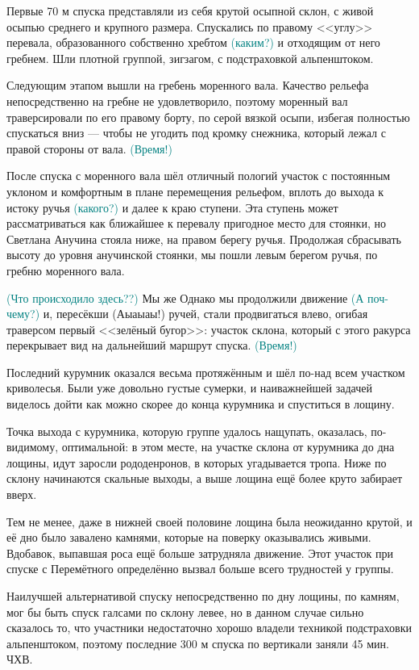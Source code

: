 Первые 70 м спуска представляли из себя крутой осыпной склон, с живой осыпью среднего и крупного размера. Спускались по правому <<углу>> перевала, образованного собственно хребтом \textcolor{teal}{(каким?)} и отходящим от него гребнем. Шли плотной группой, зигзагом, с подстраховкой альпенштоком.  

Следующим этапом вышли на гребень моренного вала. Качество рельефа непосредственно на гребне не удовлетворило, поэтому моренный вал траверсировали по его правому борту, по серой вязкой осыпи, избегая полностью спускаться вниз --- чтобы не угодить под кромку снежника, который лежал с правой стороны от вала. \textcolor{teal}{(Время!)} 

После спуска с моренного вала шёл отличный пологий участок с постоянным уклоном и комфортным в плане перемещения рельефом, вплоть до выхода к истоку ручья \textcolor{teal}{(какого?)} и далее к краю  ступени. Эта ступень может рассматриваться как ближайшее к перевалу пригодное место для стоянки, но Светлана Анучина стояла ниже, на правом берегу ручья. Продолжая сбрасывать высоту до уровня анучинской стоянки, мы пошли левым берегом ручья, по гребню моренного вала. 

\textcolor{teal}{(Что происходило здесь??)} Мы же  Однако мы продолжили движение \textcolor{teal}{(А поч-чему?)} и, пересёкши \textcolor{textcolor}{(Аыаыаы!)} ручей, стали продвигаться влево, огибая траверсом первый <<зелёный бугор>>: участок склона, который с этого ракурса перекрывает вид на дальнейший маршрут спуска. \textcolor{teal}{(Время!)} 

Последний курумник оказался весьма протяжённым и шёл по-над всем участком криволесья. Были уже довольно густые сумерки, и наиважнейшей задачей виделось дойти как можно скорее до конца курумника и спуститься в лощину. 

Точка выхода с курумника, которую группе удалось нащупать, оказалась, по-видимому, оптимальной: в этом месте, на участке склона от курумника до дна лощины, идут заросли рододенронов, в которых угадывается тропа. Ниже по склону начинаются скальные выходы, а выше лощина ещё более круто забирает вверх. 

Тем не менее, даже в нижней своей половине лощина была неожиданно крутой, и её дно было завалено камнями, которые на поверку оказывались живыми. Вдобавок, выпавшая роса ещё больше затрудняла движение. Этот участок при спуске с Перемётного определённо вызвал больше всего трудностей у группы. 

Наилучшей альтернативой спуску непосредственно по дну лощины, по камням, мог бы быть спуск галсами по склону левее, но в данном случае сильно сказалось то, что участники недостаточно хорошо владели техникой подстраховки альпенштоком, поэтому последние 300 м спуска по вертикали заняли 45 мин. ЧХВ. 



